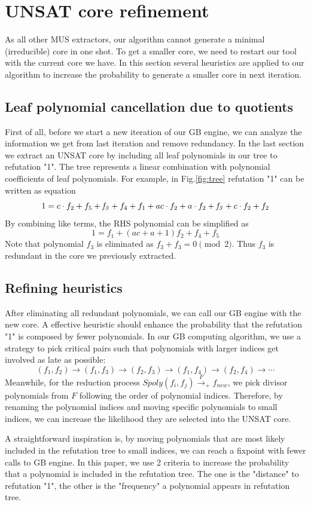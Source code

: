 \section{UNSAT core refinement}
As all other MUS extractors, our algorithm cannot generate a minimal (irreducible) core in one shot.
To get a smaller core, we need to restart our tool with the current core we have. In this section several heuristics
are applied to our algorithm to increase the probability to generate a smaller core in next iteration.

\subsection{Leaf polynomial cancellation due to quotients}
First of all, before we start a new iteration of our GB engine, we can analyze the information we get from last 
iteration and remove redundancy.
In the last section we extract an UNSAT core by including all leaf polynomials in our tree to refutation "1".
The tree represents a linear combination with polynomial coefficients
of leaf polynomials. For example, in Fig.\ref{fig:tree} refutation "1" can be written as equation
$$1 = c\cdot f_2 + f_5 + {\bf \it f_3} + f_4 + f_1 + ac\cdot f_2 + a\cdot f_2 + {\bf \it f_3} + c\cdot f_2 + f_2$$
By combining like terms, the RHS polynomial can be simplified as
$$1 = f_1 + (ac+a+1)f_2 + f_4 + f_5$$
Note that polynomial $f_3$ is eliminated as $f_3+f_3 = 0 \pmod 2$. 
Thus $f_3$ is redundant in the core we previously extracted.

\subsection{Refining heuristics}
After eliminating all redundant polynomials, we can call our GB engine with the new core.
A effective heuristic should enhance the probability that the refutation "1" is composed by fewer polynomials.
In our GB computing algorithm, we use a strategy to pick critical pairs such that polynomials with 
larger indices get involved as late as possible:
$$(f_1,f_2)\to(f_1,f_3)\to(f_2,f_3)\to(f_1,f_4)\to(f_2,f_4)\to\cdots$$
Meanwhile, for the reduction process $Spoly(f_i,f_j)\xrightarrow{F}_+ f_{new}$, we pick divisor
polynomials from $F$ following the order of polynomial indices. Therefore, by renaming the polynomial indices
and moving specific polynomials to small indices, we can increase the likelihood they are selected into the UNSAT core.

A straightforward inspiration is, by moving polynomials that are most likely included in the 
refutation tree to small indices, we can reach a fixpoint with fewer calls to GB engine.
In this paper, we use 2 criteria to increase the probability that a polynomial is included in the 
refutation tree.  The one is the "distance" to refutation "1",
the other is the "frequency" a polynomial appears in refutation tree.

